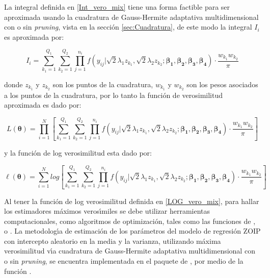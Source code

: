 La integral definida en \eqref{Int_vero_mix} tiene una forma factible para ser aproximada usando la cuadratura de Gauss-Hermite adaptativa multidimensional con o sin \textit{pruning}, vista en la secci\'{o}n \ref{sec:Cuadratura}, de este modo la integral $I_i$ es aproximada por:

\[
I_i=\sum_{k_1=1}^{Q_1}{\sum_{k_2=1}^{Q_2}{\prod_{j=1}^{n_i}f(y_{ij}|\sqrt{2}\lambda_1 z_{k_1},\sqrt{2}\lambda_2 z_{k_2};\boldsymbol{\beta_1}, \boldsymbol{\beta_2}, \boldsymbol{\beta_3}, \boldsymbol{\beta_4})\cdot \frac{w_{k_1}w_{k_2}}{\pi}}}
\]

donde $z_{k_1}$ y $z_{k_2}$ son los puntos de la cuadratura, $w_{k_1}$ y $w_{k_2}$ son los pesos asociados a los puntos de la cuadratura, por lo tanto la funci\'{o}n de verosimilitud aproximada es dado por:

\[
L(\boldsymbol{\theta})=\prod_{i=1}^{N}{\left[\sum_{k_1=1}^{Q_1}{\sum_{k_2=1}^{Q_2}{\prod_{j=1}^{n_i}f(y_{ij}|\sqrt{2}\lambda_1 z_{k_1},\sqrt{2}\lambda_2 z_{k_2};\boldsymbol{\beta_1}, \boldsymbol{\beta_2}, \boldsymbol{\beta_3}, \boldsymbol{\beta_4})\cdot \frac{w_{k_1}w_{k_2}}{\pi}}}\right]}
\]

y la funci\'{o}n de log verosimilitud esta dado por:

\begin{equation}
\ell(\boldsymbol{\theta})=\sum_{i=1}^{N}log{\left[\sum_{k_1=1}^{Q_1}{\sum_{k_2=1}^{Q_2}{\prod_{j=1}^{n_i}f(y_{ij}|\sqrt{2}\lambda_1 z_{k_1},\sqrt{2}\lambda_2 z_{k_2};\boldsymbol{\beta_1}, \boldsymbol{\beta_2}, \boldsymbol{\beta_3}, \boldsymbol{\beta_4})\cdot \frac{w_{k_1}w_{k_2}}{\pi}}}\right]}
\label{LOG_vero_mix}
\end{equation}

Al tener la funci\'{o}n de log verosimilitud definida en \eqref{LOG_vero_mix}, para hallar los estimadores m\'{a}ximos veros\'{\i}miles se debe utilizar herramientas computacionales, como algoritmos de optimizaci\'{o}n, tales como las funciones de ,  o . La metodolog\'{\i}a de estimaci\'{o}n de los par\'{a}metros del modelo de regresi\'{o}n ZOIP con intercepto aleatorio en la media y la varianza, utilizando m\'{a}xima verosimilitud v\'{\i}a cuadratura de Gauss-Hermite adaptativa multidimensional con o sin \textit{pruning}, se encuentra implementada en el paquete  de , por medio de la funci\'{o}n .

